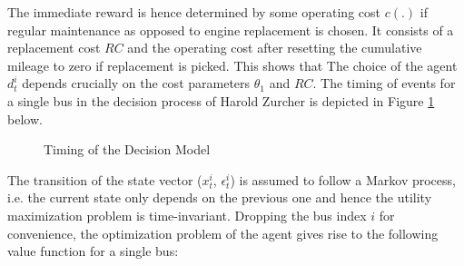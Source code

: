 The immediate reward is hence determined by some operating cost $c(.)$ if regular maintenance as opposed to engine replacement is chosen. It consists of a replacement cost $RC$ and the operating cost after resetting the cumulative mileage to zero if replacement is picked. This shows that The choice of the agent $d^i_t$ depends crucially on the cost parameters $\theta_1$ and $RC$. The timing of events for a single bus in the decision process of Harold Zurcher is depicted in Figure \ref{Figure1} below. 
\vspace{2ex}

\begin{figure}[H]
	\caption{\label{Figure1}Timing of the Decision Model}
	\vspace{2ex}
\end{figure}


The transition of the state vector ($x^i_t$, $\epsilon^i_t$) is assumed to follow a Markov process, i.e. the current state only depends on the previous one and hence the utility maximization problem is time-invariant. Dropping the bus index $i$ for convenience, the optimization problem of the agent gives rise to the following value function for a single bus: 

